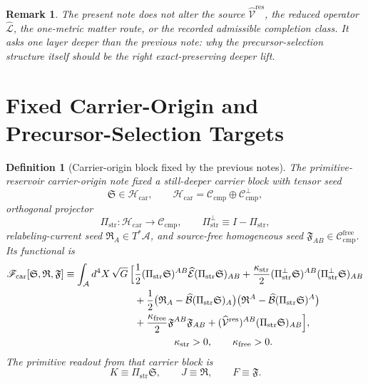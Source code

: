 \documentclass[11pt]{article}
\newcommand{\Sub}{\mathcal A}
\newcommand{\ResidualLift}{\widehat{\mathcal V}^{\mathrm{res}}}
\newcommand{\SubEinLin}{\widehat{\mathcal E}}
\newcommand{\SubGaugeVec}{\widehat{\mathcal B}}
\newcommand{\SubReducedEin}{\widehat{\mathcal L}}
\newcommand{\CompClass}{\mathscr C_{\mathrm{cmp}}}
\newcommand{\CompFree}{\mathscr C_{\mathrm{cmp}}^{\mathrm{free}}}
\newcommand{\CarrierFunctional}{\mathscr F_{\mathrm{car}}}
\newcommand{\FreeStiff}{\kappa_{\mathrm{free}}}
\newcommand{\PrimStrain}{K}
\newcommand{\PrimNeutral}{J}
\newcommand{\PrimFree}{F}
\newcommand{\CarrierClass}{\mathscr H_{\mathrm{car}}}
\newcommand{\CarrierProj}{\Pi_{\mathrm{str}}}
\newcommand{\CarrierPerp}{\Pi_{\mathrm{str}}^{\perp}}
\newcommand{\CarrierGap}{\kappa_{\mathrm{str}}}
\newcommand{\CarrierSeed}{\mathfrak S}
\newcommand{\RelabelSeed}{\mathfrak R}
\newcommand{\FreeSeed}{\mathfrak F}
\newtheorem{definition}{Definition}
\newtheorem{remark}{Remark}
\begin{document}
\begin{remark}
The present note does not alter the source \(\ResidualLift\), the reduced operator \(\SubReducedEin\), the one-metric matter route, or the recorded admissible completion class. It asks one layer deeper than the previous note: why the precursor-selection structure itself should be the right exact-preserving deeper lift.
\end{remark}

\section{Fixed Carrier-Origin and Precursor-Selection Targets}

\begin{definition}[Carrier-origin block fixed by the previous notes]
\label{def:carrier}
The primitive-reservoir carrier-origin note fixed a still-deeper carrier block with tensor seed
\[
\CarrierSeed\in\CarrierClass,
\qquad
\CarrierClass=\CompClass\oplus\CompClass^\perp,
\]
orthogonal projector
\[
\CarrierProj:\CarrierClass\to\CompClass,
\qquad
\CarrierPerp\equiv I-\CarrierProj,
\]
relabeling-current seed \(\RelabelSeed_A\in T^*\Sub\), and source-free homogeneous seed \(\FreeSeed_{AB}\in\CompFree\). Its functional is
\begin{equation}
\begin{aligned}
\CarrierFunctional[\CarrierSeed,\RelabelSeed,\FreeSeed]
\equiv
\int_{\Sub} d^4X\,\sqrt{G}\,
\Bigl[
&\frac12 (\CarrierProj\CarrierSeed)^{AB}
\SubEinLin(\CarrierProj\CarrierSeed)_{AB}
+\frac{\CarrierGap}{2}(\CarrierPerp\CarrierSeed)^{AB}(\CarrierPerp\CarrierSeed)_{AB}
\\
&+\frac12\bigl(\RelabelSeed_A-\SubGaugeVec(\CarrierProj\CarrierSeed)_A\bigr)
\bigl(\RelabelSeed^A-\SubGaugeVec(\CarrierProj\CarrierSeed)^A\bigr)
\\
&+\frac{\FreeStiff}{2}\FreeSeed^{AB}\FreeSeed_{AB}
+(\ResidualLift)^{AB}(\CarrierProj\CarrierSeed)_{AB}
\Bigr],
\\
&\qquad\qquad \CarrierGap>0,\qquad \FreeStiff>0.
\end{aligned}
\label{eq:car}
\end{equation}
The primitive readout from that carrier block is
\begin{equation}
\PrimStrain\equiv \CarrierProj\CarrierSeed,
\qquad
\PrimNeutral\equiv \RelabelSeed,
\qquad
\PrimFree\equiv \FreeSeed.
\label{eq:readout}
\end{equation}
\end{definition}
\end{document}
